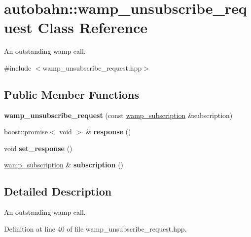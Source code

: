 \hypertarget{classautobahn_1_1wamp__unsubscribe__request}{}\section{autobahn\+:\+:wamp\+\_\+unsubscribe\+\_\+request Class Reference}
\label{classautobahn_1_1wamp__unsubscribe__request}


An outstanding wamp call.  




{\ttfamily \#include $<$wamp\+\_\+unsubscribe\+\_\+request.\+hpp$>$}

\subsection*{Public Member Functions}
\begin{DoxyCompactItemize}
\item 
{\bfseries wamp\+\_\+unsubscribe\+\_\+request} (const \hyperlink{classautobahn_1_1wamp__subscription}{wamp\+\_\+subscription} \&subscription)\hypertarget{classautobahn_1_1wamp__unsubscribe__request_a45080817166fd5b0b54d2cc80a17f6e6}{}\label{classautobahn_1_1wamp__unsubscribe__request_a45080817166fd5b0b54d2cc80a17f6e6}

\item 
boost\+::promise$<$ void $>$ \& {\bfseries response} ()\hypertarget{classautobahn_1_1wamp__unsubscribe__request_a9247f58115cea55e7284d42a200ebe55}{}\label{classautobahn_1_1wamp__unsubscribe__request_a9247f58115cea55e7284d42a200ebe55}

\item 
void {\bfseries set\+\_\+response} ()\hypertarget{classautobahn_1_1wamp__unsubscribe__request_af53e6f0de874f14a3c9b76533c9b6093}{}\label{classautobahn_1_1wamp__unsubscribe__request_af53e6f0de874f14a3c9b76533c9b6093}

\item 
\hyperlink{classautobahn_1_1wamp__subscription}{wamp\+\_\+subscription} \& {\bfseries subscription} ()\hypertarget{classautobahn_1_1wamp__unsubscribe__request_a7178d0fa1fc273fd20d3484f0e64c9d2}{}\label{classautobahn_1_1wamp__unsubscribe__request_a7178d0fa1fc273fd20d3484f0e64c9d2}

\end{DoxyCompactItemize}


\subsection{Detailed Description}
An outstanding wamp call. 

Definition at line 40 of file wamp\+\_\+unsubscribe\+\_\+request.\+hpp.

